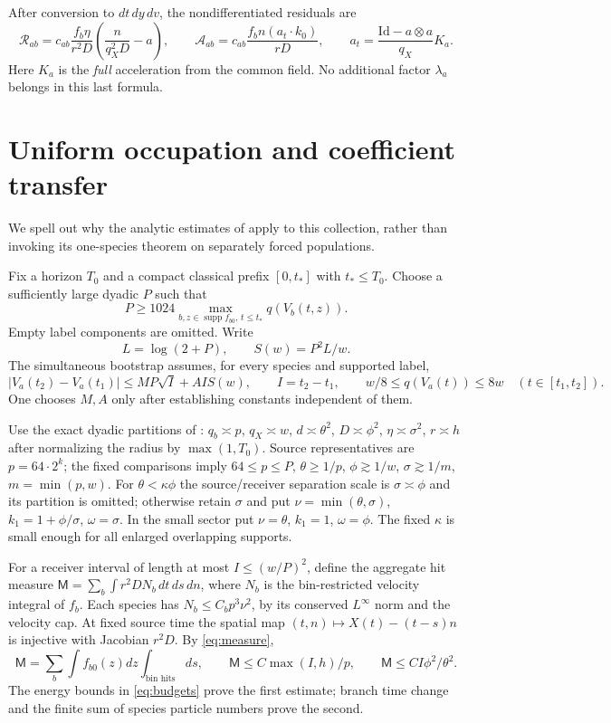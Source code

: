 \documentclass[11pt]{article}
\newcommand{\Id}{\mathrm{Id}}
\newcommand{\supp}{\operatorname{supp}}
\theoremstyle{remark}\newtheorem{remark}[theorem]{Remark}
\numberwithin{equation}{section}
\begin{document}
After conversion to $dt\,dy\,dv$, the nondifferentiated residuals are
\begin{equation}\label{eq:residuals}
 \mathcal R_{ab}=c_{ab}\frac{f_b\eta}{r^2D}
       \left(\frac{n}{q_X^2D}-a\right),\qquad
 \mathcal A_{ab}=c_{ab}\frac{f_b n(a_t\cdot k_0)}{rD},\qquad
 a_t=\frac{\Id-a\otimes a}{q_X}K_a.
\end{equation}
Here $K_a$ is the \emph{full} acceleration from the common field.
No additional factor $\lambda_a$ belongs in this last formula.

\section{Uniform occupation and coefficient transfer}
We spell out why the analytic estimates of \cite[Sections 4--8]{OAI362}
apply to this collection, rather than invoking its one-species theorem
on separately forced populations.

Fix a horizon $T_0$ and a compact classical prefix $[0,t_*]$ with
$t_*\le T_0$. Choose a sufficiently large dyadic $P$ such that
\[
 P\ge1024\max_{b,z\in\supp f_{b0},\,t\le t_*}q(V_b(t,z)).
\]
Empty label components are omitted. Write
\[
 L=\log(2+P),\qquad S(w)=P^2L/w.
\]
The simultaneous bootstrap assumes, for every species and supported label,
\begin{equation}\label{eq:bootstrap}
 |V_a(t_2)-V_a(t_1)|\le MP\sqrt I+AI S(w),\qquad I=t_2-t_1,
 \qquad w/8\le q(V_a(t))\le8w\quad(t\in[t_1,t_2]).
\end{equation}
One chooses $M,A$ only after establishing constants independent of them.

Use the exact dyadic partitions of \cite[Section 4]{OAI362}:
$q_b\asymp p$, $q_X\asymp w$, $d\asymp\theta^2$,
$D\asymp\phi^2$, $\eta\asymp\sigma^2$, $r\asymp h$ after normalizing
the radius by $\max(1,T_0)$. Source representatives are $p=64\cdot2^k$;
the fixed comparisons imply $64\le p\le P$, $\theta\ge1/p$,
$\phi\gtrsim1/w$, $\sigma\gtrsim1/m$, $m=\min(p,w)$.
For $\theta<\kappa\phi$ the source/receiver separation scale is
$\sigma\asymp\phi$ and its partition is omitted; otherwise retain
$\sigma$ and put $\nu=\min(\theta,\sigma)$,
$k_1=1+\phi/\sigma$, $\omega=\sigma$.
In the small sector put $\nu=\theta$, $k_1=1$, $\omega=\phi$.
The fixed $\kappa$ is small enough for all enlarged overlapping supports.

For a receiver interval of length at most $I\le(w/P)^2$, define the aggregate
hit measure $\mathsf M=\sum_b\int r^2D N_b\,dt\,ds\,dn$, where
$N_b$ is the bin-restricted velocity integral of $f_b$.
Each species has $N_b\le C_b p^3\nu^2$, by its conserved $L^\infty$ norm
and the velocity cap. At fixed source time the spatial map
$(t,n)\mapsto X(t)-(t-s)n$ is injective with Jacobian $r^2D$.
By \eqref{eq:measure},
\begin{equation}\label{eq:hit}
 \mathsf M=\sum_b\int f_{b0}(z)dz\int_{\text{bin hits}}ds,
 \qquad \mathsf M\le C\max(I,h)/p,
 \qquad\mathsf M\le CI\phi^2/\theta^2.
\end{equation}
The energy bounds in \eqref{eq:budgets} prove the first estimate; branch
time change and the finite sum of species particle numbers prove the second.
\end{document}

